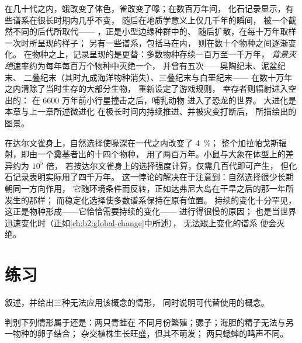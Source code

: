 \begin{proposition}[节奏与模式]\label{prop:b2:speciation:tempo}
在几十代之内，蛾改变了体色，雀改变了喙；在数百万年间，
化石记录显示，有些谱系在很长时期内几乎不变，
随后在地质学意义上仅几千年的瞬间，
被一个截然不同的后代所取代——
\emph{}，正是小型边缘种群中的、
随后扩散，在每十万年取样一次时所呈现的样子；
另有一些谱系，包括马在内，
则在数十个物种之间逐渐变化。
在物种之上，记录呈现的是更替：多数物种存续一百万至一千万年，
\emph{背景灭绝}速率约为每年每百万个物种中灭绝一个，
并曾有五次——奥陶纪末、泥盆纪末、
二叠纪末（其时九成海洋物种消失）、三叠纪末与白垩纪末——
\emph{}在数十万年之内清除了当时生存的大部分生物，
重新设定了游戏规则，
幸存者则辐射进入空出的：
在 6600 万年前小行星撞击之后，哺乳动物
进入了恐龙的世界。
大进化是本章与上一章所述微进化
在极长时间内持续推进、并被灾变打断后，
所描绘出的图景。
\end{proposition}

\begin{example}[速率比较]\label{ex:b2:speciation:rates}
在达尔文雀身上，自然选择使喙深在一代之内改变了 \qty{4}{\%}；
整个加拉帕戈斯辐射，即由一个奠基者出的十四个物种，
用了两百万年。小鼠与大象在体型上的差异约为 $10^{5}$ 倍，
若按达尔文雀身上的选择强度计算，仅需几百代即可产生，
但化石记录表明实际用了四千万年。
这一悖论的解决在于注意到：自然选择很少长期朝同一方向作用，
它随环境条件而反转，正如达弗尼大岛在干旱之后的那一年所发生的那样；
而稳定化选择使多数谱系保持在原有位置。
持续的变化十分罕见，这正是物种形成——它恰恰需要持续的变化——
进行得很慢的原因；
也是当世界迅速变化时（正如\cref{ch:b2:global-change}中所述），
无法跟上变化的谱系
便会灭绝。
\end{example}

\section{练习}

\begin{exercise}[$\star$]\label{exo:b2:speciation:1}
叙述，并给出三种无法应用该概念的情形，
同时说明可代替使用的概念。
\end{exercise}

\begin{exercise}[$\star$]\label{exo:b2:speciation:2}
判别下列情形属于还是：两只青蛙在
不同月份繁殖；骡子；海胆的精子无法与另一物种的卵子结合；
杂交植株生长旺盛，但其不萌发；
两只蟋蟀的鸣声不同。
\end{exercise}

